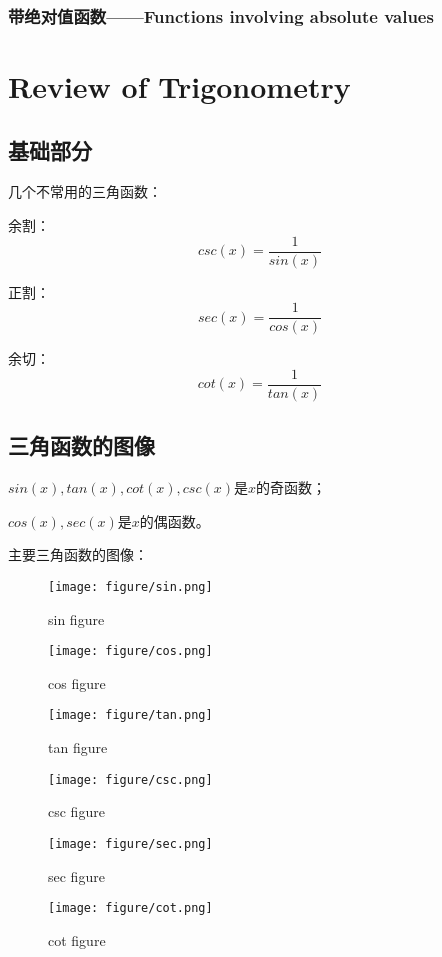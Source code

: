 \documentclass[11pt, b5paper, oneside]{book}
\begin{document}
\subsection{带绝对值函数——Functions involving absolute values}

\chapter{Review of Trigonometry}

\section{基础部分}

几个不常用的三角函数：

余割：
\[csc(x)=\frac{1}{sin(x)}\]

正割：
\[sec(x)=\frac{1}{cos(x)}\]

余切：
\[cot(x)=\frac{1}{tan(x)}\]

\section{三角函数的图像}

$sin(x),tan(x),cot(x),csc(x)$是$x$的奇函数；

$cos(x),sec(x)$是$x$的偶函数。

主要三角函数的图像：

\begin{figure}[H]
    \centering
    \texttt{[image: figure/sin.png]}
    \caption{sin figure}
\end{figure}
\begin{figure}[H]
    \centering
    \texttt{[image: figure/cos.png]}
    \caption{cos figure}
\end{figure}
\begin{figure}[H]
    \centering
    \texttt{[image: figure/tan.png]}
    \caption{tan figure}
\end{figure}
\begin{figure}[H]
    \centering
    \texttt{[image: figure/csc.png]}
    \caption{csc figure}
\end{figure}
\begin{figure}[H]
    \centering
    \texttt{[image: figure/sec.png]}
    \caption{sec figure}
\end{figure}
\begin{figure}[H]
    \centering
    \texttt{[image: figure/cot.png]}
    \caption{cot figure}
\end{figure}
\end{document}
